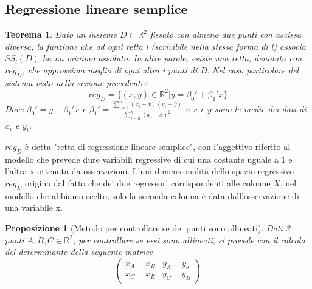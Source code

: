 \documentclass[12pt]{article}
\newenvironment{para}{\begin{adjustwidth}{13mm}{}}{\end{adjustwidth}}
\newtheorem{Teorema}{Teorema}[subsection]
\newtheorem{Proposizione}{Proposizione}[subsection]
\begin{document}
\begin{para}
\subsection{Regressione lineare semplice}
\begin{Teorema}
    Dato un insieme $D \subset \mathbb{R}^2$ fissato con almeno due punti con ascissa diversa, la funzione che ad ogni retta l (scrivibile nella stessa forma di l) associa $SS_l(D)$ ha un minimo assoluto. In altre parole, esiste una retta, denotata con $reg_D$, che approssima meglio di ogni altra i punti di D. Nel caso particolare del sistema visto nella sezione precedente:
    $$reg_D = \{(x,y)\in \mathbb{R}^2 | y=\beta_0'+\beta_1'x\}$$
    Dove $\beta_0' = \overline{y}-\beta_1'\overline{x}$ e $\beta_1' = \frac{\sum_{i=1}^n(x_i-\overline{x})(y_i-\overline{y})}{\sum_{i=n}^n(x_i-\overline{x})^2}$ e $\overline{x}$ e $\overline{y}$ sono le medie dei dati di $x_i$ e $y_i$.
\end{Teorema}
$reg_D$ è detta "retta di regressione lineare semplice", con l'aggettivo riferito al modello che prevede dure variabili regressive di cui una costante uguale a 1 e l'altra x ottenuta da osservazioni. L'uni-dimensionalità dello spazio regressivo $reg_D$ origina dal fatto che dei due regressori corrispondenti alle colonne $\underline{X}$, nel modello che abbiamo scelto, solo la seconda colonna è data dall'osservazione di una variabile x.
\begin{Proposizione}[Metodo per controllare se dei punti sono allineati]
Dati 3 punti $A,B,C \in \mathbb{R}^2$, per controllare se essi sono allineati, si procede con il calcolo del determinante della seguente matrice $$\begin{pmatrix}
    x_A-x_B & y_A-y_b \\
    x_C-x_B & y_C-y_B
\end{pmatrix}$$
\end{Proposizione}

\end{para}
\end{document}

